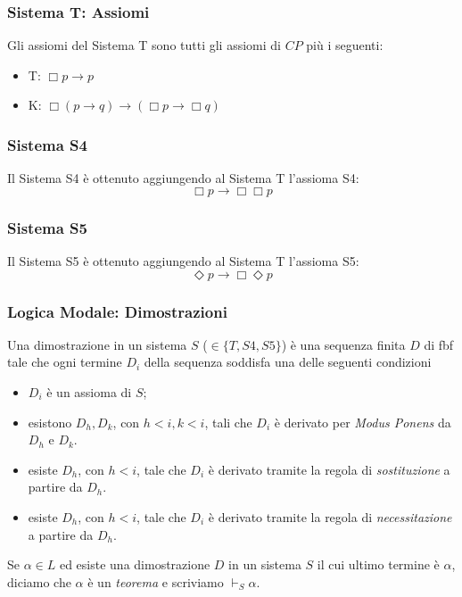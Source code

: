 \documentclass[notheorem,aspectratio=169]{beamer}
\begin{document}

\begin{frame}
\frametitle{Sistema T: Assiomi}
Gli assiomi del Sistema T sono tutti gli assiomi di $CP$ più i seguenti:
\begin{itemize}
\item T: $\Box p \rightarrow p$
\item K: $\Box(p \rightarrow q) \rightarrow (\Box p \rightarrow \Box q)$
\end{itemize}
\end{frame}

\begin{frame}
\frametitle{Sistema S4}
Il Sistema S4 è ottenuto aggiungendo al Sistema T l'assioma S4:
$$\Box p \rightarrow \Box \Box p$$
\end{frame}

\begin{frame}
\frametitle{Sistema S5}
Il Sistema S5 è ottenuto aggiungendo al Sistema T l'assioma S5:
$$\Diamond p \rightarrow \Box \Diamond p$$
\end{frame}

\begin{frame}
\frametitle{Logica Modale: Dimostrazioni}
Una dimostrazione in un sistema $S$ ($\in \{ T, S4, S5\}$)  è una sequenza finita $D$ di fbf tale che
ogni termine $D_i$ della sequenza soddisfa una delle seguenti condizioni
\begin{itemize}
\item $D_i$ è un assioma di $S$;
\item esistono $D_h, D_k$, con $h < i, k < i$, tali che $D_i$ è derivato per \emph{Modus Ponens}
da $D_h$ e $D_k$.
\item esiste $D_h$, con $h < i$, tale che $D_i$ è derivato tramite
la regola di \emph{sostituzione} a partire da $D_h$.
\item {\color{red} esiste $D_h$, con $h < i$, tale che $D_i$ è derivato tramite
la regola di \emph{necessitazione} a partire da $D_h$}.
\end{itemize}

Se $\alpha \in L$ ed esiste una dimostrazione $D$ in un sistema $S$ il cui ultimo termine è $\alpha$,
diciamo che $\alpha$ è un \emph{teorema} e scriviamo $\vdash_S \alpha$.
\end{frame}
\end{document}

